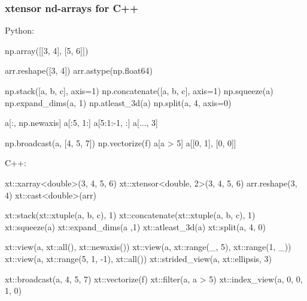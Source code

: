 \documentclass{beamer}
\begin{document}
\begin{frame}
    \frametitle{xtensor nd-arrays for C++}
        \hspace{-1.0cm}
        \begin{minipage}{0.48\textwidth}
            Python:
            \vspace{-0.3cm}
            \begin{pythoncode}
            np.array([[3, 4], [5, 6]])

            arr.reshape([3, 4])
            arr.astype(np.float64)

            np.stack([a, b, c], axis=1)
            np.concatenate([a, b, c], axis=1)
            np.squeeze(a)
            np.expand_dims(a, 1)
            np.atleast_3d(a)
            np.split(a, 4, axis=0)

            a[:, np.newaxis]
            a[:5, 1:]
            a[5:1:-1, :]
            a[..., 3]

            np.broadcast(a, [4, 5, 7]) 
            np.vectorize(f)
            a[a > 5]
            a[[0, 1], [0, 0]]
            \end{pythoncode}

        \end{minipage}
        \hspace{0.25cm}
        \begin{minipage}{0.48\textwidth}
            C++:
            \vspace{-0.3cm}
            \begin{cppcode}
            xt::xarray<double>({{3, 4}, {5, 6}})
            xt::xtensor<double, 2>({{3, 4}, {5, 6}})
            arr.reshape({3, 4})
            xt::cast<double>(arr)

            xt::stack(xt::xtuple(a, b, c), 1)
            xt::concatenate(xt::xtuple(a, b, c), 1)
            xt::squeeze(a)
            xt::expand_dims(a ,1)
            xt::atleast_3d(a)
            xt::split(a, 4, 0)

            xt::view(a, xt::all(), xt::newaxis())
            xt::view(a, xt::range(_, 5), xt::range(1, _))
            xt::view(a, xt::range(5, 1, -1), xt::all())
            xt::strided_view(a, {xt::ellipsis, 3})

            xt::broadcast(a, {4, 5, 7})
            xt::vectorize(f)
            xt::filter(a, a > 5)
            xt::index_view(a, {{0, 0}, {1, 0}})
            \end{cppcode}
            
        \end{minipage}
\end{frame}
\end{document}
